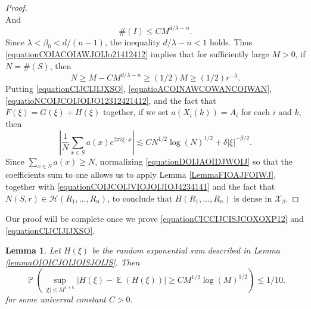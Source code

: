 \documentclass[dvipsnames,letterpaper,12pt]{article}
\numberwithin{equation}{section}
\newtheorem{lemma}[theorem]{Lemma}
\numberwithin{theorem}{section}
\DeclareMathOperator{\EE}{\mathbb{E}}
\DeclareMathOperator{\PP}{\mathbb{P}}
\begin{document}
\begin{proof}
\begin{equation}
    \end{equation}
    And
    \begin{equation} \label{equationCOIACOIAWJOIJo21412412}
        \#(I) \leq C M^{d/\lambda - n}.
    \end{equation}
    Since $\lambda < \beta_0 < d/(n-1)$, the inequality $d/\lambda - n < 1$ holds. Thus \eqref{equationCOIACOIAWJOIJo21412412} implies that for sufficiently large $M > 0$, if $N = \#(S)$, then
    \begin{equation} \label{equationCOIJCOIJVIOJOIJIOJ4234141}
        N \geq M - C M^{d/\lambda - n} \geq (1/2) M \geq (1/2) r^{-\lambda}.
    \end{equation}
    Putting \eqref{equationCIJCIJIJXSO}, \eqref{equatioACOINAWCOWANCOIWAN}, \eqref{equatioNCOIJCOIJOIJO12312421412}, and the fact that $F(\xi) = G(\xi) + H(\xi)$ together, if we set $a(X_i(k)) = A_i$ for each $i$ and $k$, then
    \begin{equation} \label{equationDOIJAOIDJWOIJ}
        \left| \frac{1}{N} \sum_{x \in S} a(x) e^{2 \pi i \xi \cdot x} \right| \lesssim C N^{1/2} \log(N)^{1/2} + \delta |\xi|^{-\beta/2}.
    \end{equation}
    Since $\sum_{x \in S} a(x) \geq N$, normalizing \eqref{equationDOIJAOIDJWOIJ} so that the coefficients sum to one allows us to apply Lemma \ref{LemmaFIOAJFOIWJ}, together with \eqref{equationCOIJCOIJVIOJOIJIOJ4234141} and the fact that $N(S,r) \in \mathcal{H}(R_1,\dots,R_n)$, to conclude that $H(R_1,\dots,R_n)$ is dense in $\mathcal{X}_\beta$.
\end{proof}

Our proof will be complete once we prove \eqref{equationCICCIJCISJCOXOXP12} and \eqref{equationCIJCIJIJXSO}.

\begin{lemma} \label{lemma24901401921209}
    Let $H(\xi)$ be the random exponential sum described in Lemma \ref{lemmaOIOICJOIJOISJOIJS}. Then
    \[ \PP \left( \sup_{|\xi| \leq M^{1 + \kappa}} | H(\xi) - \EE(H(\xi)) | \geq C M^{1/2} \log(M)^{1/2} \right) \leq 1/10. \]
    for some universal constant $C > 0$.
\end{lemma}

\end{document}
